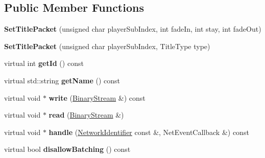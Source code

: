 \subsection*{Public Member Functions}
\begin{DoxyCompactItemize}
\item 
\mbox{\label{struct_set_title_packet_a07fc9faa9630aca0ce99019baecfea84}} 
{\bfseries Set\+Title\+Packet} (unsigned char player\+Sub\+Index, int fade\+In, int stay, int fade\+Out)
\item 
\mbox{\label{struct_set_title_packet_a025e2ef64b37998e5840a665364ce248}} 
{\bfseries Set\+Title\+Packet} (unsigned char player\+Sub\+Index, Title\+Type type)
\item 
\mbox{\label{struct_set_title_packet_a1f428b691f688914fd8c2849fa25e5f9}} 
virtual int {\bfseries get\+Id} () const
\item 
\mbox{\label{struct_set_title_packet_a5c8b4ee236e30f0011ec7c860a0b2077}} 
virtual std\+::string {\bfseries get\+Name} () const
\item 
\mbox{\label{struct_set_title_packet_a97d2768ac38b364965b3d7a0389fed4a}} 
virtual void $\ast$ {\bfseries write} (\mbox{\hyperlink{struct_binary_stream}{Binary\+Stream}} \&) const
\item 
\mbox{\label{struct_set_title_packet_a7ba66e34e7d81912b08e39e5320cbbea}} 
virtual void $\ast$ {\bfseries read} (\mbox{\hyperlink{struct_binary_stream}{Binary\+Stream}} \&)
\item 
\mbox{\label{struct_set_title_packet_adb16d267d850e17a87a6553c6668f8b5}} 
virtual void $\ast$ {\bfseries handle} (\mbox{\hyperlink{struct_network_identifier}{Network\+Identifier}} const \&, Net\+Event\+Callback \&) const
\item 
\mbox{\label{struct_set_title_packet_aec7ece4aedd6663383e6726139505d1b}} 
virtual bool {\bfseries disallow\+Batching} () const
\end{DoxyCompactItemize}
